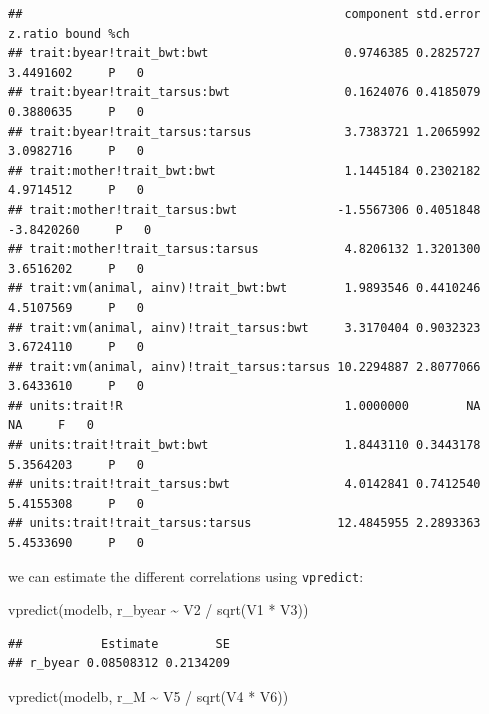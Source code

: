 \documentclass[
  12pt,
]{book}
\newenvironment{Shaded}{\begin{snugshade}}{\end{snugshade}}
\newcommand{\FunctionTok}[1]{\textcolor[rgb]{0.00,0.00,0.00}{#1}}
\newcommand{\NormalTok}[1]{#1}
\newcommand{\SpecialCharTok}[1]{\textcolor[rgb]{0.00,0.00,0.00}{#1}}
\begin{document}
\begin{verbatim}
##                                             component std.error    z.ratio bound %ch
## trait:byear!trait_bwt:bwt                   0.9746385 0.2825727  3.4491602     P   0
## trait:byear!trait_tarsus:bwt                0.1624076 0.4185079  0.3880635     P   0
## trait:byear!trait_tarsus:tarsus             3.7383721 1.2065992  3.0982716     P   0
## trait:mother!trait_bwt:bwt                  1.1445184 0.2302182  4.9714512     P   0
## trait:mother!trait_tarsus:bwt              -1.5567306 0.4051848 -3.8420260     P   0
## trait:mother!trait_tarsus:tarsus            4.8206132 1.3201300  3.6516202     P   0
## trait:vm(animal, ainv)!trait_bwt:bwt        1.9893546 0.4410246  4.5107569     P   0
## trait:vm(animal, ainv)!trait_tarsus:bwt     3.3170404 0.9032323  3.6724110     P   0
## trait:vm(animal, ainv)!trait_tarsus:tarsus 10.2294887 2.8077066  3.6433610     P   0
## units:trait!R                               1.0000000        NA         NA     F   0
## units:trait!trait_bwt:bwt                   1.8443110 0.3443178  5.3564203     P   0
## units:trait!trait_tarsus:bwt                4.0142841 0.7412540  5.4155308     P   0
## units:trait!trait_tarsus:tarsus            12.4845955 2.2893363  5.4533690     P   0
\end{verbatim}

we can estimate the different correlations using \texttt{vpredict}:

\begin{Shaded}
\begin{Highlighting}[]
\FunctionTok{vpredict}\NormalTok{(modelb, r\_byear }\SpecialCharTok{\textasciitilde{}}\NormalTok{ V2 }\SpecialCharTok{/} \FunctionTok{sqrt}\NormalTok{(V1 }\SpecialCharTok{*}\NormalTok{ V3))}
\end{Highlighting}
\end{Shaded}

\begin{verbatim}
##           Estimate        SE
## r_byear 0.08508312 0.2134209
\end{verbatim}

\begin{Shaded}
\begin{Highlighting}[]
\FunctionTok{vpredict}\NormalTok{(modelb, r\_M }\SpecialCharTok{\textasciitilde{}}\NormalTok{ V5 }\SpecialCharTok{/} \FunctionTok{sqrt}\NormalTok{(V4 }\SpecialCharTok{*}\NormalTok{ V6))}
\end{Highlighting}
\end{Shaded}
\end{document}
